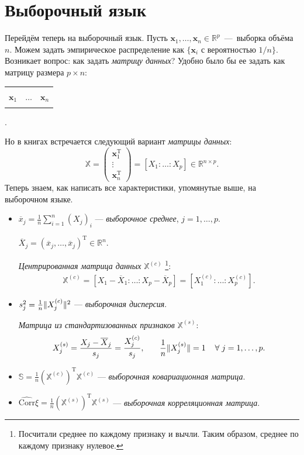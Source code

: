 \documentclass[specialist, 12pt,
subf, %
href, colorlinks=true,
substylefile = spbu.rtx,
]{disser}
\begin{document}
\section{Выборочный язык}
Перейдём теперь на выборочный язык. Пусть $\mathbf{x}_1, \ldots, \mathbf{x}_n \in \mathbb{R}^p$~---~выборка объёма $n$. Можем задать эмпирическое распределение как $\{\mathbf{x}_i \text{ с вероятностью } 1/n\}$. Возникает вопрос: как задать \textit{матрицу данных}? Удобно было бы ее задать как матрицу размера $p \times n$:
\begin{table}[H]
	\centering
	\begin{tabular}{|c|c|c|}
		\hline
		&          &                \\
		$\mathbf{x}_1$ & $\ldots$ & $\mathbf{x}_n$ \\
		&          &   \\
		\hline
	\end{tabular}.
\end{table}
Но в книгах встречается следующий вариант \textit{матрицы данных}:
$$\mathbb{X} = \begin{pmatrix}
\mathbf{x}_1^{\mathrm{T}}\\
\vdots\\
\mathbf{x}_n^{\mathrm{T}}
\end{pmatrix} =
[X_1: \ldots: X_p] \in \mathbb{R}^{n \times p}.$$
Теперь знаем, как написать все характеристики, упомянутые выше, на выборочном языке.
\begin{itemize}
	\item $\overline{x}_j = \frac{1}{n}\sum \limits_{i = 1}^{n} (X_j)_i$ --- \textit{выборочное среднее}, $j=1,\ldots,p$.
	
	 $\overline{X}_j=(\overline{x}_j,\ldots,\overline{x}_j)^\mathrm{T} \in \mathbb{R}^n.$
	
	
	\textit{Центрированная матрица данных} $\mathbb{X}^{(c)}$ \footnote{Посчитали среднее по каждому признаку и вычли. Таким образом, среднее по каждому признаку нулевое.}:
	\begin{gather*}
	\mathbb{X}^{(c)} = [X_1 - \overline{X}_1: \ldots: X_p - \overline{X}_p]=[X_1^{(c)}:\ldots: X_p^{(c)}].
	\end{gather*}
	\item $s^2_j = \frac{1}{n} \Arrowvert X_j^{(c)}\Arrowvert^2$ --- \textit{выборочная дисперсия}.
	
	\textit{Матрица из стандартизованных признаков} $\mathbb{X}^{(s)}$:
	\begin{gather*}
	X_j^{(s)} = \frac{X_j - \overline{X}_j}{s_j} = \frac{X_j^{(c)}}{s_j}, \hspace{0.64 cm} \frac{1}{n}\Arrowvert X_j^{(s)}\Arrowvert = 1 \hspace{0.4 cm} \forall \hspace{0.1 cm} j=1,\ldots, p.
	\end{gather*}
	
	\item $\mathbb{S} = \frac{1}{n}(\mathbb{X}^{(c)})^{\mathrm{T}}\mathbb{X}^{(c)}$ --- \textit{выборочная ковариационная матрица}.
	\item $\widehat{\mathrm{Corr}} \xi = \frac{1}{n}(\mathbb{X}^{(s)})^{\mathrm{T}}\mathbb{X}^{(s)}$ --- \textit{выборочная корреляционная матрица}.
\end{itemize}
\end{document}

